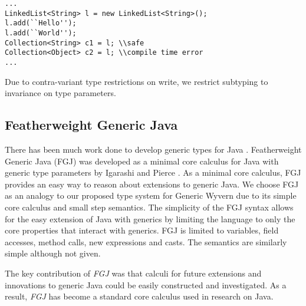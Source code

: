 \documentclass[11pt
              , a4paper
              , twoside
              , openright
              ]{report}
\numberwithin{case}{theorem}
\numberwithin{subcase}{case}
\begin{document}
\begin{lstlisting}[mathescape, style=customlang]
...
LinkedList<String> l = new LinkedList<String>();
l.add(``Hello'');
l.add(``World'');
Collection<String> c1 = l; \\safe
Collection<Object> c2 = l; \\compile time error
...
\end{lstlisting}
Due to contra-variant type restrictions on write, we restrict subtyping to invariance on type parameters.


\subsection{Featherweight Generic Java}
There has been much work done to develop generic types for Java \cite{agesen1997adding, Bracha:1998:MFS:286936.286957, Cartwright:1998:CGR:286936.286958, Odersky:1997:PJT:263699.263715, Bank:1997:PTJ:263699.263714}. Featherweight Generic Java (FGJ) was developed as a minimal core calculus for Java with generic type parameters by Igarashi and Pierce \cite{Igarashi:2001:FJM:503502.503505}. As a minimal core calculus, FGJ provides an easy way to reason about extensions to generic Java. We choose FGJ as an analogy to our proposed type system for Generic Wyvern due to its simple core calculus and small step semantics.
The simplicity of the FGJ syntax allows for the easy extension of Java with generics \cite{Potanin:2006:GOG:1167473.1167500, Zibin:2010:OIG:1932682.1869509} by limiting the language to only the core properties that interact with generics. FGJ is limited to variables, field accesses, method calls, new expressions and casts. The semantics are similarly simple although not given. 

The key contribution of \emph{FGJ} was that calculi for future extensions and innovations to generic Java could be easily constructed and investigated. As a result, \emph{FGJ} has become a standard core calculus used in research on Java.
\end{document}
